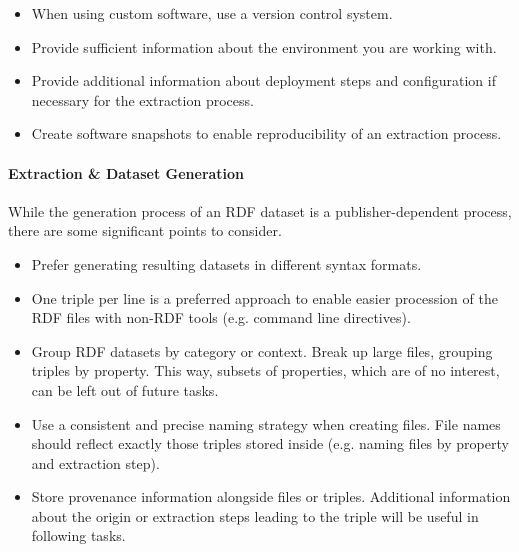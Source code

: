 \documentclass[a4paper,english,twoside,BCOR1.5cm,headsepline,DIV12,appendixprefix,final,12pt]{scrbook}
\def\emph{\textit}
\begin{document}
\begin{itemize}
\itemsep0em 
\item When using custom software, use a version control system.
\item Provide sufficient information about the environment you are working with.
\item Provide additional information about deployment steps and configuration if necessary for the extraction process.
\item Create software snapshots to enable reproducibility of an extraction process.
\end{itemize}

\vspace{-1.5em}
\paragraph{Extraction \& Dataset Generation}
While the generation process of an RDF dataset is a publisher-dependent process, there are some significant points to consider.

\begin{itemize}
\itemsep0em 
\item Prefer generating resulting datasets in different syntax formats. 
\item One triple per line is a preferred approach to enable easier procession of the RDF files with non-RDF tools (e.g. command line directives).
\item Group RDF datasets by category or context. Break up large files, grouping triples by property. This way, subsets of properties, which are of no interest, can be left out of future tasks.
\item Use a consistent and precise naming strategy when creating files. File names should reflect exactly those triples stored inside (e.g. naming files by property and extraction step).
\item Store provenance information alongside files or triples. Additional information about the origin or extraction steps leading to the triple will be useful in following tasks.
\end{itemize}

\end{document}
